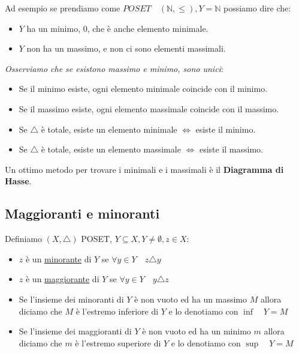 \documentclass{article}
\theoremstyle{definition}
\begin{document}
Ad esempio se prendiamo come $POSET \quad (\mathbb{N}, \le), Y = \mathbb{N}$ possiamo dire che:
\begin{itemize}
        \item $Y$ ha un minimo, $0$, che è anche elemento minimale.
        \item $Y$ non ha un massimo, e non ci sono elementi massimali. 
\end{itemize}

\textit{Osserviamo che se esistono massimo e minimo, sono unici}:
\begin{itemize}
        \item Se il minimo esiste, ogni elemento minimale coincide con il minimo.
        \item Se il massimo esiste, ogni elemento massimale coincide con il massimo.
        \item Se $\triangle$ è totale, esiste un elemento minimale $\Leftrightarrow$ esiste il minimo.
        \item Se $\triangle$ è totale, esiste un elemento massimale $\Leftrightarrow$ esiste il massimo. 
\end{itemize}

Un ottimo metodo per trovare i minimali e i massimali è il \textbf{Diagramma di Hasse}. \par



\subsection{Maggioranti e minoranti}
Definiamo $(X, \triangle)$ POSET, $Y \subseteq X, Y \not = \emptyset, z \in X$:

\begin{itemize}
        \item $z$ è un \underline{minorante} di $Y$ se $\forall y \in Y \quad z \triangle y$
        \item $z$ è un \underline{maggiorante} di $Y$ se $\forall y \in Y \quad y \triangle z$

        \item Se l'insieme dei minoranti di $Y$ è non vuoto ed ha un massimo $M$ allora diciamo che $M$ è l'estremo inferiore di $Y$ e lo denotiamo con $\inf \quad  Y = M$
        \item Se l'insieme dei maggioranti di $Y$ è non vuoto ed ha un minimo $m$ allora diciamo che $m$ è l'estremo superiore di $Y$ e lo denotiamo con $\sup \quad  Y = M$
\end{itemize}
\end{document}
